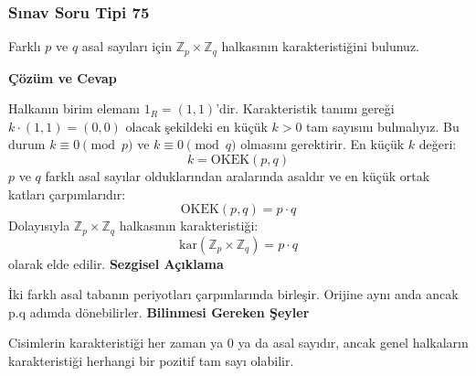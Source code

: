 \documentclass[11pt, a4paper]{article}
\newenvironment{cozum}{
    \vspace{0.5cm}
    \noindent\textcolor{green!60!black}{\faCheckCircle\enspace \textbf{\Large Çözüm ve Cevap}}\par\vspace{0.2cm}
}{}
\newenvironment{sezgisel}{
    \vspace{0.5cm}
    \noindent\textcolor{orange!80!black}{\faLightbulb\enspace \textbf{\Large Sezgisel Açıklama}}\par\vspace{0.2cm}
    \itshape
}{}
\newenvironment{bilgi}{
    \vspace{0.5cm}
    \noindent\textcolor{red!70!black}{\faExclamationTriangle\enspace \textbf{\Large Bilinmesi Gereken Şeyler}}\par\vspace{0.2cm}
}{}
\begin{document}
\subsubsection{Sınav Soru Tipi 75}
\begin{sinavbox}
Farklı $p$ ve $q$ asal sayıları için $\mathbb{Z}_{p} \times \mathbb{Z}_{q}$ halkasının karakteristiğini bulunuz.
\end{sinavbox}
\begin{cozum}
Halkanın birim elemanı $1_R = (1, 1)$'dir.
Karakteristik tanımı gereği $k \cdot (1, 1) = (0, 0)$ olacak şekildeki en küçük $k > 0$ tam sayısını bulmalıyız.
Bu durum $k \equiv 0 \pmod p$ ve $k \equiv 0 \pmod q$ olmasını gerektirir.
En küçük $k$ değeri:
\[ k = \text{OKEK}(p, q) \]
$p$ ve $q$ farklı asal sayılar olduklarından aralarında asaldır ve en küçük ortak katları çarpımlarıdır:
\[ \text{OKEK}(p, q) = p \cdot q \]
Dolayısıyla $\mathbb{Z}_p \times \mathbb{Z}_q$ halkasının karakteristiği:
\[ \text{kar}(\mathbb{Z}_p \times \mathbb{Z}_q) = p \cdot q \]
olarak elde edilir.
\end{cozum}
\begin{sezgisel}
İki farklı asal tabanın periyotları çarpımlarında birleşir. Orijine aynı anda ancak p.q adımda dönebilirler.
\end{sezgisel}
\begin{bilgi}
Cisimlerin karakteristiği her zaman ya 0 ya da asal sayıdır, ancak genel halkaların karakteristiği herhangi bir pozitif tam sayı olabilir.
\end{bilgi}
\end{document}
